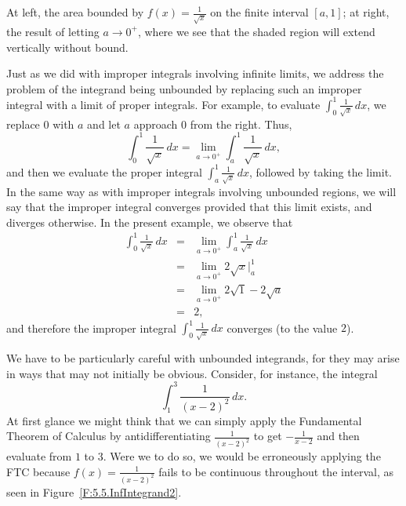 \begin{marginfigure}[-1cm] %
\caption{At left, the area bounded by $f(x) = \frac{1}{\sqrt{x}}$ on the finite interval $[a,1]$; at right, the result of letting $a \to 0^+$, where we see that the shaded region will extend vertically without bound.} \label{F:5.5.InfIntegrand}
\end{marginfigure}

Just as we did with improper integrals involving infinite limits, we address the problem of the integrand being unbounded by replacing such an improper integral with a limit of proper integrals.  For example, to evaluate $\int_0^1 \frac{1}{\sqrt{x}} \, dx$, we replace $0$ with $a$ and let $a$ approach $0$ from the right.  Thus,
$$\int_0^1 \frac{1}{\sqrt{x}} \, dx = \lim_{a \to 0^+} \int_a^1 \frac{1}{\sqrt{x}} \, dx,$$
and then we evaluate the proper integral $\int_a^1 \frac{1}{\sqrt{x}} \, dx$, followed by taking the limit.  In the same way as with improper integrals involving unbounded regions, we will say that the improper integral converges provided that this limit exists, and diverges otherwise.  In the present example, we observe that
\begin{eqnarray*}
\int_0^1 \frac{1}{\sqrt{x}} \, dx & = & \lim_{a \to 0^+} \int_a^1 \frac{1}{\sqrt{x}} \, dx \\
					& = & \lim_{a \to 0^+} 2\sqrt{x} \big\vert_a^1 \\
					& = & \lim_{a \to 0^+} 2\sqrt{1} - 2\sqrt{a} \\
					& = & 2,
\end{eqnarray*}
and therefore the improper integral $\int_0^1 \frac{1}{\sqrt{x}} \, dx$ converges (to the value $2$).

We have to be particularly careful with unbounded integrands, for they may arise in ways that may not initially be obvious.  Consider, for instance, the integral
$$\int_1^3 \frac{1}{(x-2)^2} \, dx.$$
At first glance we might think that we can simply apply the Fundamental Theorem of Calculus by antidifferentiating $\frac{1}{(x-2)^2}$ to get $-\frac{1}{x-2}$ and then evaluate from $1$ to $3$.  Were we to do so, we would be erroneously applying the FTC because $f(x) = \frac{1}{(x-2)^2}$ fails to be continuous throughout the interval, as seen in Figure~\ref{F:5.5.InfIntegrand2}.

